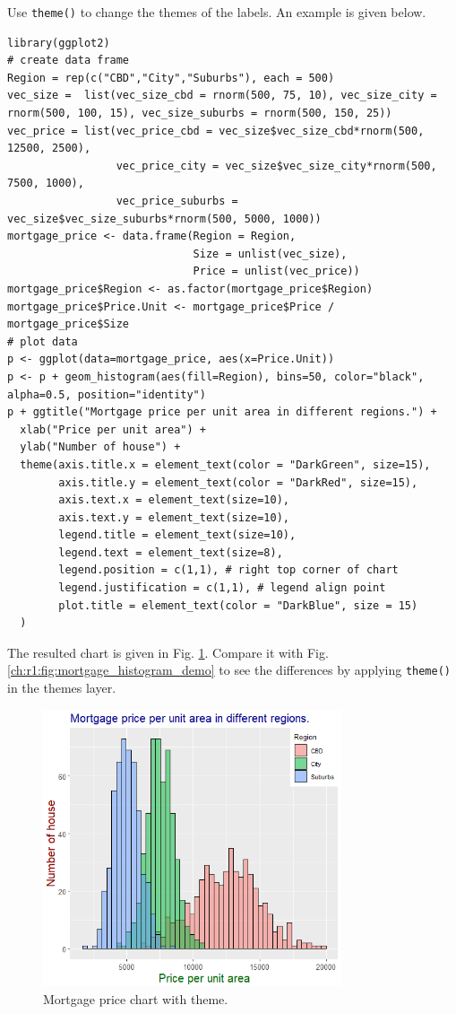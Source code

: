 Use \verb|theme()| to change the themes of the labels. An example is given below.
\begin{lstlisting}
library(ggplot2)
# create data frame
Region = rep(c("CBD","City","Suburbs"), each = 500)
vec_size =  list(vec_size_cbd = rnorm(500, 75, 10), vec_size_city = rnorm(500, 100, 15), vec_size_suburbs = rnorm(500, 150, 25))
vec_price = list(vec_price_cbd = vec_size$vec_size_cbd*rnorm(500, 12500, 2500),
                 vec_price_city = vec_size$vec_size_city*rnorm(500, 7500, 1000),
                 vec_price_suburbs = vec_size$vec_size_suburbs*rnorm(500, 5000, 1000))
mortgage_price <- data.frame(Region = Region,
                             Size = unlist(vec_size),
                             Price = unlist(vec_price))
mortgage_price$Region <- as.factor(mortgage_price$Region)
mortgage_price$Price.Unit <- mortgage_price$Price / mortgage_price$Size
# plot data
p <- ggplot(data=mortgage_price, aes(x=Price.Unit))
p <- p + geom_histogram(aes(fill=Region), bins=50, color="black", alpha=0.5, position="identity")
p + ggtitle("Mortgage price per unit area in different regions.") +
  xlab("Price per unit area") +
  ylab("Number of house") +
  theme(axis.title.x = element_text(color = "DarkGreen", size=15),
        axis.title.y = element_text(color = "DarkRed", size=15),
        axis.text.x = element_text(size=10),
        axis.text.y = element_text(size=10),
        legend.title = element_text(size=10),
        legend.text = element_text(size=8),
        legend.position = c(1,1), # right top corner of chart
        legend.justification = c(1,1), # legend align point
        plot.title = element_text(color = "DarkBlue", size = 15)
  )
\end{lstlisting}

The resulted chart is given in Fig. \ref{ch:r1:fig:mortgage_histogram_theme}. Compare it with Fig. \ref{ch:r1:fig:mortgage_histogram_demo} to see the differences by applying \verb|theme()| in the themes layer.
\begin{figure}
	\centering
	\includegraphics[width=250pt]{chapters/ch-r/figures/mortgage_histogram_theme.png}
	\caption{Mortgage price chart with theme.} \label{ch:r1:fig:mortgage_histogram_theme}
\end{figure}

